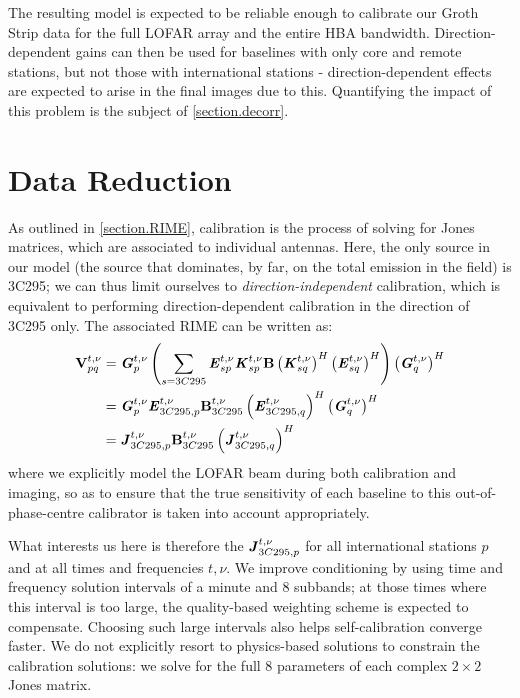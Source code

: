 \pg
The resulting model is expected to be reliable enough to calibrate our Groth Strip data for the full LOFAR array and the entire HBA bandwidth. Direction-dependent gains can then be used for baselines with only core and remote stations, but not those with international stations - direction-dependent effects are expected to arise in the final images due to this. Quantifying the impact of this problem is the subject of \cref{section.decorr}.

\section{Data Reduction}

\pg
As outlined in \cref{section.RIME}, calibration is the process of solving for Jones matrices, which are associated to individual antennas. Here, the only source in our model (the source that dominates, by far, on the total emission in the field) is 3C295; we can thus limit ourselves to \textit{direction-independent} calibration, which is equivalent to performing direction-dependent calibration in the direction of 3C295 only. The associated RIME can be written as:
\begin{align}
\textbf{V}_{pq}^{t,\nu} &= \textbf{\emph{G}}_p^{t,\nu} \left( \sum_{s=3C295} \textbf{\emph{E}}_{sp}^{t,\nu} \textbf{\emph{K}}_{sp}^{t,\nu} \textbf{B} \left(\textbf{\emph{K}}_{sq}^{t,\nu}\right)^H \left(\textbf{\emph{E}}_{sq}^{t,\nu}\right)^H \right) \left(\textbf{\emph{G}}_q^{t,\nu}\right)^H\\
		  &= \textbf{\emph{G}}_p^{t,\nu} \textbf{\emph{E}}_{3C295,p}^{t,\nu} \textbf{B}_{3C295}^{t,\nu} \left(\textbf{\emph{E}}_{3C295,q}^{t,\nu}\right)^H \left(\textbf{\emph{G}}_q^{t,\nu}\right)^H\\
		  &= \textbf{\emph{J}}_{3C295,p}^{t,\nu} \textbf{B}_{3C295}^{t,\nu} \left(\textbf{\emph{J}}_{3C295,q}^{t,\nu}\right)^H
\end{align}
where we explicitly model the LOFAR beam during both calibration and imaging, so as to ensure that the true sensitivity of each baseline to this out-of-phase-centre calibrator is taken into account appropriately.

\pg
What interests us here is therefore the $\textbf{\emph{J}}_{3C295,p}^{t,\nu}$ for all international stations $p$ and at all times and frequencies $t,\nu$. We improve conditioning by using time and frequency solution intervals of a minute and 8 subbands; at those times where this interval is too large, the quality-based weighting scheme is expected to compensate. Choosing such large intervals also helps self-calibration converge faster. We do not explicitly resort to physics-based solutions to constrain the calibration solutions: we solve for the full 8 parameters of each complex $2\times 2$ Jones matrix.

